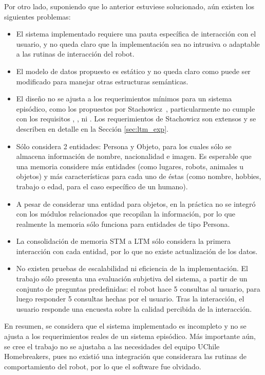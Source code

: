 Por otro lado, suponiendo que lo anterior estuviese solucionado, aún existen los siguientes problemas:
\begin{itemize}
	\item El sistema implementado requiere una pauta específica de interacción con el usuario, y no queda claro que la implementación sea no intrusiva o adaptable a las rutinas de interacción del robot. 
	\item El modelo de datos propuesto es estático y no queda claro como puede ser modificado para manejar otras estructuras semánticas.
	\item El diseño no se ajusta a los requerimientos mínimos para un sistema episódico, como los propuestos por Stachowicz~\cite{Stachowicz2012}, particularmente no cumple con los requisitos , ,  ni . Los requerimientos de Stachowicz son extensos y se describen en detalle en la Sección \ref{sec:ltm_exp}.
	\item Sólo considera 2 entidades: Persona y Objeto, para los cuales sólo se almacena información de nombre, nacionalidad e imagen. Es esperable que una memoria considere más entidades (como lugares, robots, animales u objetos) y más características para cada uno de éstas (como nombre, hobbies, trabajo o edad, para el caso específico de un humano).
	\item A pesar de considerar una entidad para objetos, en la práctica no se integró con los módulos relacionados que recopilan la información, por lo que realmente la memoria sólo funciona para entidades de tipo Persona.
	\item La consolidación de memoria STM a LTM sólo considera la primera interacción con cada entidad, por lo que no existe actualización de los datos.
	\item No existen pruebas de escalabilidad ni eficiencia de la implementación. El trabajo sólo presenta una evaluación subjetiva del sistema, a partir de un conjunto de preguntas predefinidas: el robot hace 5 consultas al usuario, para luego responder 5 consultas hechas por el usuario. Tras la interacción, el usuario responde una encuesta sobre la calidad percibida de la interacción.
\end{itemize}

En resumen, se considera que el sistema implementado es incompleto y no se ajusta a los requerimientos reales de un sistema episódico. Más importante aún, se cree el trabajo no se ajustaba a las necesidades del equipo UChile Homebreakers, pues no existió una integración que considerara las rutinas de comportamiento del robot, por lo que el software fue olvidado.

